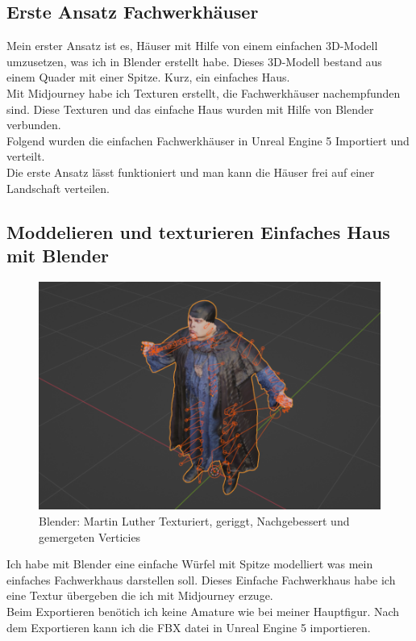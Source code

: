 \subsection{Erste Ansatz Fachwerkhäuser}%
Mein erster Ansatz ist es, Häuser mit Hilfe von einem einfachen 3D-Modell umzusetzen, was ich in Blender erstellt habe. Dieses 3D-Modell bestand aus einem Quader mit einer Spitze. Kurz, ein einfaches Haus.
\\
Mit Midjourney habe ich Texturen erstellt, die Fachwerkhäuser nachempfunden sind. Diese Texturen und das einfache Haus wurden mit Hilfe von Blender verbunden.
\\
Folgend wurden die einfachen Fachwerkhäuser in Unreal Engine 5 Importiert und verteilt.
\\
Die erste Ansatz lässt funktioniert und man kann die Häuser frei auf einer Landschaft verteilen.

\subsection{Moddelieren und texturieren Einfaches Haus mit Blender}
\begin{figure}
	\centering
	\includegraphics[width=14cm]{BilderFuerBA/BlenderMLGeriggtUndTexturiert95k.png}
	\caption{Blender: Martin Luther Texturiert, geriggt, Nachgebessert und gemergeten Verticies}
	\label{BlenderMLGeriggtUndTexturiert95k}
\end{figure}
Ich habe mit Blender eine einfache Würfel mit Spitze modelliert was mein einfaches Fachwerkhaus darstellen soll. Dieses Einfache Fachwerkhaus habe ich eine Textur übergeben die ich mit Midjourney erzuge.
\\
Beim Exportieren benötich ich keine Amature wie bei meiner Hauptfigur. Nach dem Exportieren kann ich die FBX datei in Unreal Engine 5 importieren.

